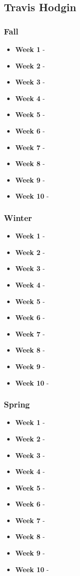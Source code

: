 \documentclass[onecolumn, draftclsnofoot,10pt, compsoc]{IEEEtran}
\begin{document}
		\subsection{Travis Hodgin}
			\subsubsection{Fall}
				\begin{itemize}
					\item \textbf{Week 1} - 
					\item \textbf{Week 2} - 
					\item \textbf{Week 3} - 
					\item \textbf{Week 4} - 
					\item \textbf{Week 5} - 
					\item \textbf{Week 6} - 
					\item \textbf{Week 7} - 
					\item \textbf{Week 8} - 
					\item \textbf{Week 9} - 
					\item \textbf{Week 10} - 
				\end{itemize}
			\subsubsection{Winter}
				\begin{itemize}
					\item \textbf{Week 1} - 
					\item \textbf{Week 2} - 
					\item \textbf{Week 3} - 
					\item \textbf{Week 4} - 
					\item \textbf{Week 5} - 
					\item \textbf{Week 6} - 
					\item \textbf{Week 7} - 
					\item \textbf{Week 8} - 
					\item \textbf{Week 9} - 
					\item \textbf{Week 10} - 
				\end{itemize}
			\subsubsection{Spring}
				\begin{itemize}
					\item \textbf{Week 1} - 
					\item \textbf{Week 2} - 
					\item \textbf{Week 3} - 
					\item \textbf{Week 4} - 
					\item \textbf{Week 5} - 
					\item \textbf{Week 6} - 
					\item \textbf{Week 7} - 
					\item \textbf{Week 8} - 
					\item \textbf{Week 9} - 
					\item \textbf{Week 10} - 
				\end{itemize}
\end{document}
